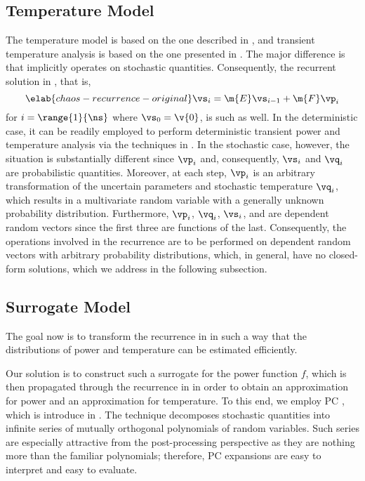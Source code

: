 \subsection{Temperature Model}

The temperature model is based on the one described in ,
and transient temperature analysis is based on the one presented in
. The major difference is that
 implicitly operates on stochastic quantities.
Consequently, the recurrent solution in , that
is,
\begin{equation} \elab{chaos-recurrence-original}
  \vs_i = \m{E} \vs_{i - 1} + \m{F} \vp_i
\end{equation}
for $i = \range{1}{\ns}$ where $\vs_0 = \v{0}$, is such as well. In the
deterministic case, it can be readily employed to perform deterministic
transient power and temperature analysis via the techniques in
. In the stochastic case, however, the
situation is substantially different since $\vp_i$ and, consequently, $\vs_i$
and $\vq_i$ are probabilistic quantities. Moreover, at each step, $\vp_i$ is an
arbitrary transformation of the uncertain parameters \vu and stochastic
temperature $\vq_i$, which results in a multivariate random variable with a
generally unknown probability distribution. Furthermore, $\vp_i$, $\vq_i$,
$\vs_i$, and \vu are dependent random vectors since the first three are
functions of the last. Consequently, the operations involved in the recurrence
are to be performed on dependent random vectors with arbitrary probability
distributions, which, in general, have no closed-form solutions, which we
address in the following subsection.

\subsection{Surrogate Model}

The goal now is to transform the recurrence in 
in such a way that the distributions of power and temperature can be estimated
efficiently.

Our solution is to construct such a surrogate for the power function $f$, which
is then propagated through the recurrence in  in
order to obtain an approximation for power and an approximation for temperature.
To this end, we employ \acf{PC} \cite{xiu2010}, which is introduce in
. The technique decomposes stochastic quantities into
infinite series of mutually orthogonal polynomials of random variables. Such
series are especially attractive from the post-processing perspective as they
are nothing more than the familiar polynomials; therefore, \ac{PC} expansions
are easy to interpret and easy to evaluate.

